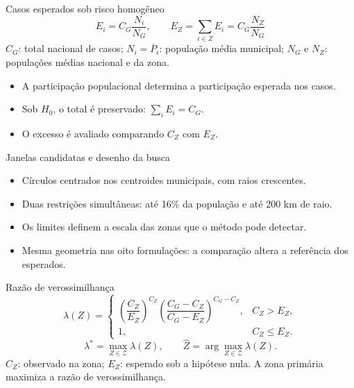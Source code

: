 \documentclass[aspectratio=169,11pt]{beamer}
\newcommand{\fonte}[1]{\par\vspace{0.15cm}{\fontsize{7}{9}\selectfont\color{cinza}#1\par}}
\begin{document}
\begin{frame}{Casos esperados sob risco homogêneo}
\[
E_i=C_G\frac{N_i}{N_G},\qquad
E_Z=\sum_{i\in Z}E_i=C_G\frac{N_Z}{N_G}
\]
$C_G$: total nacional de casos; $N_i=\overline P_i$: população média municipal; $N_G$ e $N_Z$: populações médias nacional e da zona.
\medskip\begin{itemize}
\item A participação populacional determina a participação esperada nos casos.
\item Sob $H_0$, o total é preservado: $\sum_iE_i=C_G$.
\item O excesso é avaliado comparando $C_Z$ com $E_Z$.
\end{itemize}
\end{frame}

\begin{frame}{Janelas candidatas e desenho da busca}
\begin{itemize}
\item Círculos centrados nos centroides municipais, com raios crescentes.
\item Duas restrições simultâneas: até 16\% da população e até 200 km de raio.
\item Os limites definem a escala das zonas que o método pode detectar.
\item Mesma geometria nas oito formulações: a comparação altera a referência dos esperados.
\end{itemize}
\end{frame}

\begin{frame}{Razão de verossimilhança}
\[
\lambda(Z)=\begin{cases}
\left(\dfrac{C_Z}{E_Z}\right)^{C_Z}
\left(\dfrac{C_G-C_Z}{C_G-E_Z}\right)^{C_G-C_Z},&C_Z>E_Z,\\[5pt]
1,&C_Z\leq E_Z.
\end{cases}
\]
\[
\lambda^\ast=\max_{Z\in\mathcal Z}\lambda(Z),\qquad
\widehat Z=\arg\max_{Z\in\mathcal Z}\lambda(Z).
\]
$C_Z$: observado na zona; $E_Z$: esperado sob a hipótese nula.
\medskip A zona primária maximiza a razão de verossimilhança.
\end{frame}
\end{document}
